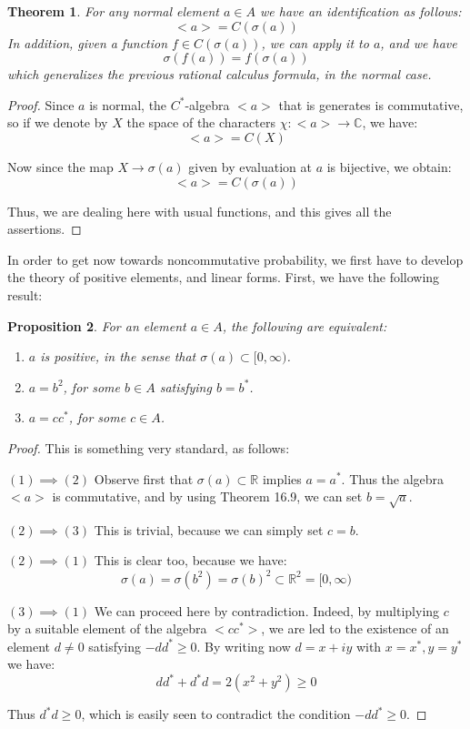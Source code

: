\documentclass[12pt]{amsbook}
\newtheorem{theorem}{Theorem}[chapter]
\newtheorem{proposition}[theorem]{Proposition}
\begin{document}
\begin{theorem}
For any normal element $a\in A$ we have an identification as follows:
$$<a>=C(\sigma(a))$$
In addition, given a function $f\in C(\sigma(a))$, we can apply it to $a$, and we have
$$\sigma(f(a))=f(\sigma(a))$$
which generalizes the previous rational calculus formula, in the normal case.
\end{theorem}

\begin{proof}
Since $a$ is normal, the $C^*$-algebra $<a>$ that is generates is commutative, so if we denote by $X$ the space of the characters $\chi:<a>\to\mathbb C$, we have:
$$<a>=C(X)$$

Now since the map $X\to\sigma(a)$ given by evaluation at $a$ is bijective, we obtain:
$$<a>=C(\sigma(a))$$

Thus, we are dealing here with usual functions, and this gives all the assertions.
\end{proof}

In order to get now towards noncommutative probability, we first have to develop the theory of positive elements, and linear forms. First, we have the following result:

\begin{proposition}
For an element $a\in A$, the following are equivalent:
\begin{enumerate}
\item $a$ is positive, in the sense that $\sigma(a)\subset[0,\infty)$.

\item $a=b^2$, for some $b\in A$ satisfying $b=b^*$.

\item $a=cc^*$, for some $c\in A$.
\end{enumerate}
\end{proposition}

\begin{proof}
This is something very standard, as follows:

\medskip

$(1)\implies(2)$ Observe first that $\sigma(a)\subset\mathbb R$ implies $a=a^*$. Thus the algebra $<a>$ is commutative, and by using Theorem 16.9, we can set $b=\sqrt{a}$.

\medskip

$(2)\implies(3)$ This is trivial, because we can simply set $c=b$. 

\medskip

$(2)\implies(1)$ This is clear too, because we have:
$$\sigma(a)
=\sigma(b^2)
=\sigma(b)^2\subset\mathbb R^2
=[0,\infty)$$

$(3)\implies(1)$ We can proceed here by contradiction. Indeed, by multiplying $c$ by a suitable element of the algebra $<cc^*>$, we are led to the existence of an element $d\neq0$ satisfying $-dd^*\geq0$. By writing now $d=x+iy$ with $x=x^*,y=y^*$ we have:
$$dd^*+d^*d
=2(x^2+y^2)
\geq0$$

Thus $d^*d\geq0$, which is easily seen to contradict the condition $-dd^*\geq0$.
\end{proof}
\end{document}
